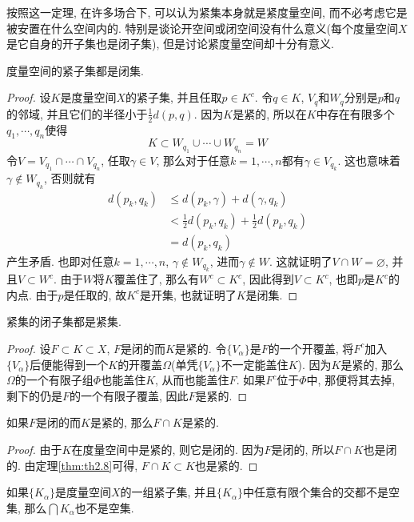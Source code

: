\documentclass[cn,12pt,math=mtpro2,citestyle=gb7714-2015,bibstyle=gb7714-2015,twocol]{elegantbook}
\let\emptyset\varnothing
\begin{document}
按照这一定理, 在许多场合下, 可以认为紧集本身就是紧度量空间, 而不必考虑它是被安置在什么空间内的. 特别是谈论开空间或闭空间没有什么意义(每个度量空间$X$是它自身的开子集也是闭子集), 但是讨论紧度量空间却十分有意义.
\begin{theorem}\label{thm:th2.8}
  度量空间的紧子集都是闭集.
\end{theorem}
\begin{proof}
  设$K$是度量空间$X$的紧子集, 并且任取$p\in K^c$. 令$q\in K$, $V_q$和$W_q$分别是$p$和$q$的邻域, 并且它们的半径小于$\displaystyle\frac{1}{2}d(p,q)$. 因为$K$是紧的, 所以在$K$中存在有限多个$q_1,\cdots,q_n$使得
  $$K\subset W_{q_1}\cup\cdots\cup W_{q_n}=W$$
  令$V=V_{q_1}\cap\cdots\cap V_{q_n}$, 任取$\gamma\in V$, 那么对于任意$k=1,\cdots,n$都有$\gamma\in V_{q_k}$. 这也意味着$\gamma \notin W_{q_k}$, 否则就有
  \begin{align*}
  d(p_k,q_k)&\leq d(p_k,\gamma)+d(\gamma,q_k) \\
  &<\frac{1}{2}d(p_k,q_k)+\frac{1}{2}d(p_k,q_k) \\
  &=d(p_k,q_k)
  \end{align*}
  产生矛盾. 也即对任意$k=1,\cdots,n$, $\gamma\notin W_{q_k}$, 进而$\gamma\notin W$. 这就证明了$V\cap W=\emptyset$, 并且$V\subset W^c$. 由于$W$将$K$覆盖住了, 那么有$W^c\subset K^c$, 因此得到$V\subset K^c$, 也即$p$是$K^c$的内点. 由于$p$是任取的, 故$K^c$是开集, 也就证明了$K$是闭集.
\end{proof}
\begin{theorem}\label{thm:th2.18}
  紧集的闭子集都是紧集.
\end{theorem}
\begin{proof}
  设$F\subset K\subset X$, $F$是闭的而$K$是紧的. 令$\{V_\alpha\}$是$F$的一个开覆盖, 将$F^c$加入$\{V_\alpha\}$后便能得到一个$K$的开覆盖$\Omega$(单凭$\{V_\alpha\}$不一定能盖住$K$). 因为$K$是紧的, 那么$\Omega$的一个有限子组$\Phi$也能盖住$K$, 从而也能盖住$F$. 如果$F^c$位于$\Phi$中, 那便将其去掉, 剩下的仍是$F$的一个有限子覆盖, 因此$F$是紧的.
\end{proof}
\begin{corollary}\label{cor:cor2.1}
如果$F$是闭的而$K$是紧的, 那么$F\cap K$是紧的.
\end{corollary}
\begin{proof}
  由于$K$在度量空间中是紧的, 则它是闭的. 因为$F$是闭的, 所以$F\cap K$也是闭的. 由定理\ref{thm:th2.8}可得, $F\cap K\subset K$也是紧的.
\end{proof}
\begin{theorem}\label{thm:th2.14}
  如果$\{K_\alpha\}$是度量空间$X$的一组紧子集, 并且$\{K_\alpha\}$中任意有限个集合的交都不是空集, 那么$\bigcap K_\alpha$也不是空集.
\end{theorem}
\end{document}
